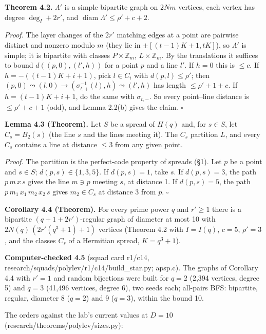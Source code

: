 \documentclass[
  10pt,
]{article}
\begin{document}
\textbf{Theorem 4.2.} \(\Lambda'\) is a simple bipartite graph on
\(2Nm\) vertices, each vertex has degree \(\deg_I+2r'\), and
\(\operatorname{diam}\Lambda'\le\rho'+c+2\).

\emph{Proof.} The layer changes of the \(2r'\) matching edges at a point
are pairwise distinct and nonzero modulo \(m\) (they lie in
\(\pm[(t-1)K+1, tK]\)), so \(\Lambda'\) is simple; it is bipartite with
classes \(P\times\mathbb Z_m\), \(L\times\mathbb Z_m\). By the
translations it suffices to bound \(d((p,0),(l',h))\) for a point \(p\)
and a line \(l'\). If \(h = 0\) this is \(\le c\). If
\(h = -((t-1)K+i+1)\), pick \(l\in C_i\) with \(d(p,l)\le\rho'\); then
\((p,0)\leadsto(l,0)\to(\sigma_{t,+}^{-1}(l),h)\leadsto(l',h)\) has
length \(\le\rho'+1+c\). If \(h = (t-1)K+i+1\), do the same with
\(\sigma_{t,-}\). So every point--line distance is \(\le\rho'+c+1\)
(odd), and Lemma 2.2(b) gives the claim. \(\square\)

\textbf{Lemma 4.3 (Theorem).} Let \(S\) be a spread of \(H(q)\) and, for
\(s\in S\), let \(C_s = B_2(s)\) (the line \(s\) and the lines meeting
it). The \(C_s\) partition \(L\), and every \(C_s\) contains a line at
distance \(\le 3\) from any given point.

\emph{Proof.} The partition is the perfect-code property of spreads
(§1). Let \(p\) be a point and \(s\in S\); \(d(p,s)\in\{1,3,5\}\). If
\(d(p,s) = 1\), take \(s\). If \(d(p,s)=3\), the path \(p\,m\,x\,s\)
gives the line \(m\ni p\) meeting \(s\), at distance 1. If
\(d(p,s) = 5\), the path \(p\,m_1\,x_1\,m_2\,x_2\,s\) gives
\(m_2\in C_s\) at distance 3 from \(p\). \(\square\)

\textbf{Corollary 4.4 (Theorem).} For every prime power \(q\) and
\(r'\ge 1\) there is a bipartite \((q+1+2r')\)-regular graph of diameter
at most 10 with \(2N(q)\,(2r'(q^3+1)+1)\) vertices (Theorem 4.2 with
\(I = I(q)\), \(c = 5\), \(\rho' = 3\), and the classes \(C_s\) of a
Hermitian spread, \(K = q^3+1\)).

\textbf{Computer-checked 4.5} (squad card r1/c14,
research/squads/polylev/r1/c14/build\_star.py; apsp.c). The graphs of
Corollary 4.4 with \(r' = 1\) and random bijections were built for
\(q = 2\) (2,394 vertices, degree 5) and \(q = 3\) (41,496 vertices,
degree 6), two seeds each; all-pairs BFS: bipartite, regular, diameter 8
(\(q = 2\)) and 9 (\(q = 3\)), within the bound 10.

The orders against the lab's current values at \(D = 10\)
(research/theorems/polylev/sizes.py):
\end{document}
